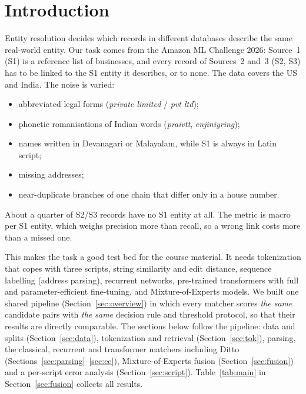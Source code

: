 \section{Introduction}
\label{sec:intro}

Entity resolution decides which records in different databases describe the same real-world
entity. Our task comes from the Amazon ML Challenge 2026: Source~1
(S1) is a reference list of businesses, and every record of Sources~2 and~3 (S2, S3) has to be linked to the
S1 entity it describes, or to none. The data covers the US and India. The noise is varied:
\begin{itemize}
  \item abbreviated legal forms (\emph{private limited} / \emph{pvt ltd});
  \item phonetic romanisations of Indian words (\emph{praivtt}, \emph{enjiniyring});
  \item names written in Devanagari or Malayalam, while S1 is always in Latin script;
  \item missing addresses;
  \item near-duplicate branches of one chain that differ only in a house number.
\end{itemize}
About a quarter of S2/S3 records have no S1 entity at all. The metric is macro \fhalf{} per S1 entity,
which weighs precision more than recall, so a wrong link costs more than a missed one.

This makes the task a good test bed for the course material. It needs tokenization that copes with
three scripts, string similarity and edit distance, sequence labelling (address parsing), recurrent
networks, pre-trained transformers with full and parameter-efficient fine-tuning, and Mixture-of-Experts
models. We built one shared pipeline (Section~\ref{sec:overview}) in which every matcher scores \emph{the same}
candidate pairs with \emph{the same} decision rule and threshold protocol, so that their results are
directly comparable. The sections below follow the pipeline: data and splits (Section~\ref{sec:data}), tokenization and retrieval (Section~\ref{sec:tok}), parsing, the classical, recurrent and transformer matchers including Ditto (Sections~\ref{sec:parsing}--\ref{sec:ce}), Mixture-of-Experts fusion (Section~\ref{sec:fusion}) and a per-script error analysis (Section~\ref{sec:script}).
Table~\ref{tab:main} in Section~\ref{sec:fusion} collects all results.
